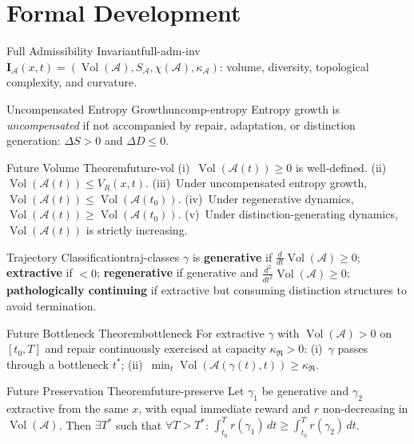 \documentclass[12pt,twoside,openright]{book}
\newcommand{\adm}{\mathcal{A}}
\newcommand{\repair}{\mathfrak{R}}
\newcommand{\Vol}{\operatorname{Vol}}
\newcounter{exercise}[chapter]
\begin{document}
\section{Formal Development}
\label{sec:ch15-formal}

\begin{definition}{Full Admissibility Invariant}{full-adm-inv}
  $\mathbf{I}_\adm(x,t)
  =(\Vol(\adm),S_\adm,\chi(\adm),\kappa_\adm)$:
  volume, diversity, topological complexity, and curvature.
\end{definition}

\begin{definition}{Uncompensated Entropy Growth}{uncomp-entropy}
  Entropy growth is \emph{uncompensated} if not accompanied
  by repair, adaptation, or distinction generation:
  $\Delta S>0$ and $\Delta D\le0$.
\end{definition}

\begin{theorem}{Future Volume Theorem}{future-vol}
  (i)~$\Vol(\adm(t))\ge0$ is well-defined.
  (ii)~$\Vol(\adm(t))\le V_R(x,t)$.
  (iii)~Under uncompensated entropy growth,
  $\Vol(\adm(t))\le\Vol(\adm(t_0))$.
  (iv)~Under regenerative dynamics,
  $\Vol(\adm(t))\ge\Vol(\adm(t_0))$.
  (v)~Under distinction-generating dynamics,
  $\Vol(\adm(t))$ is strictly increasing.
\end{theorem}

\begin{definition}{Trajectory Classification}{traj-classes}
  $\gamma$ is \textbf{generative} if
  $\frac{d}{dt}\Vol(\adm)\ge0$;
  \textbf{extractive} if $<0$;
  \textbf{regenerative} if generative and
  $\frac{d^2}{dt^2}\Vol(\adm)\ge0$;
  \textbf{pathologically continuing} if extractive but
  consuming distinction structures to avoid termination.
\end{definition}

\begin{theorem}{Future Bottleneck Theorem}{bottleneck}
  For extractive $\gamma$ with $\Vol(\adm)>0$ on $[t_0,T]$
  and repair continuously exercised at capacity
  $\kappa_\repair>0$:
  (i)~$\gamma$ passes through a bottleneck $t^*$;
  (ii)~$\min_t\Vol(\adm(\gamma(t),t))\ge\kappa_\repair$.
\end{theorem}

\begin{theorem}{Future Preservation Theorem}{future-preserve}
  Let $\gamma_1$ be generative and $\gamma_2$ extractive
  from the same $x$, with equal immediate reward and $r$
  non-decreasing in $\Vol(\adm)$.
  Then $\exists T^*$ such that $\forall T>T^*$:
  $\int_{t_0}^T r(\gamma_1)\,dt\ge
  \int_{t_0}^T r(\gamma_2)\,dt$.
\end{theorem}
\end{document}

